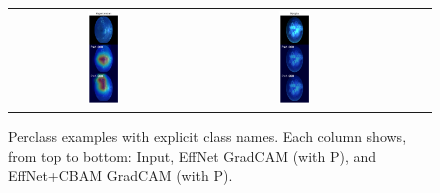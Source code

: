 \begin{figure}[t]
\begin{tabular}{ccccc}
    \includegraphics[width=0.18\textwidth]{../new_work/figures/gradcam_benchmark_Hypertension.png} &
    \includegraphics[width=0.18\textwidth]{../new_work/figures/gradcam_benchmark_Myopia.png} \\
  \end{tabular}
  \caption{Per\textendash class examples with explicit class names. Each column shows, from top to bottom: Input, EffNet Grad\textendash CAM (with P), and EffNet+CBAM Grad\textendash CAM (with P).}
  \label{fig:gradcam_perclass}
\end{figure}

